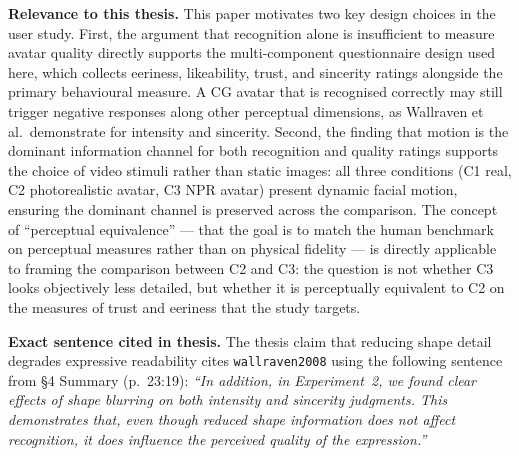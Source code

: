 \documentclass[11pt, a4paper]{article}
\begin{document}
\textbf{Relevance to this thesis.} This paper motivates two key design choices in the user study. First, the argument that recognition alone is insufficient to measure avatar quality directly supports the multi-component questionnaire design used here, which collects eeriness, likeability, trust, and sincerity ratings alongside the primary behavioural measure. A CG avatar that is recognised correctly may still trigger negative responses along other perceptual dimensions, as Wallraven et al.\ demonstrate for intensity and sincerity. Second, the finding that motion is the dominant information channel for both recognition and quality ratings supports the choice of video stimuli rather than static images: all three conditions (C1 real, C2 photorealistic avatar, C3 NPR avatar) present dynamic facial motion, ensuring the dominant channel is preserved across the comparison. The concept of ``perceptual equivalence'' --- that the goal is to match the human benchmark on perceptual measures rather than on physical fidelity --- is directly applicable to framing the comparison between C2 and C3: the question is not whether C3 looks objectively less detailed, but whether it is perceptually equivalent to C2 on the measures of trust and eeriness that the study targets.

\textbf{Exact sentence cited in thesis.} The thesis claim that reducing shape detail degrades expressive readability cites \texttt{wallraven2008} using the following sentence from \S4 Summary (p.\ 23:19): \textit{``In addition, in Experiment~2, we found clear effects of shape blurring on both intensity and sincerity judgments. This demonstrates that, even though reduced shape information does not affect recognition, it does influence the perceived quality of the expression.''}

\newpage
\end{document}
